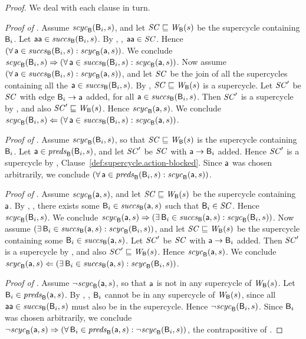 \begin{proof}
We deal with each clause in turn.


\textit{Proof of }.
%
Assume $\scyc{\B}{s}{\B_i}$, and let $\SC \subg \wfg{\B}{s}$ be the supercycle containing $\B_i$.  Let
$\actp \in \succs{\B}{s}{\B_i}$.  By , ,
$\actp \in \SC$.  Hence $(\fa \act \in \succs{\B}{s}{\B_i} : \scyc{\B}{s}{\act})$.
We conclude
$\scyc{\B}{s}{\B_i} \imp (\fa \act \in \succs{\B}{s}{\B_i} : \scyc{\B}{s}{\act})$.
%
Now assume $(\fa \act \in \succs{\B}{s}{\B_i} : \scyc{\B}{s}{\act})$, and let 
$\SC$ be the join of all the supercycles containing all the $\act \in \succs{\B}{s}{\B_i}$. 
By , $\SC \subg \wfg{\B}{s}$ is a supercycle.
Let $\SC'$ be $\SC$ with edge $\B_i \ar \act$ added, for all 
$\act \in \succs{\B}{s}{\B_i}$.
Then $\SC'$ is a supercycle by 
, and also $\SC' \subg \wfg{\B}{s}$. Hence $\scyc{\B}{s}{\act}$.
We conclude 
$\scyc{\B}{s}{\B_i} \folf (\fa \act \in \succs{\B}{s}{\B_i} : \scyc{\B}{s}{\act})$.




\textit{Proof of }.
%
Assume $\scyc{\B}{s}{\B_i}$, so that $\SC \subg \wfg{\B}{s}$ is the supercycle containing $\B_i$.
Let  $\act \in \preds{\B}{s}{\B_i}$, and let $\SC'$ be $\SC$ with 
$\act \ar \B_i$ added. Hence $\SC'$ is a supercycle by ,
  Clause~\ref{def:supercycle.action-blocked}.
Since $\act$ was chosen arbitrarily, we conclude 
$(\fa \act \in \preds{\B}{s}{\B_i} : \scyc{\B}{s}{\act})$.



\textit{Proof of }.
%
Assume $\scyc{\B}{s}{\act}$, and let $\SC \subg \wfg{\B}{s}$ be the supercycle containing $\act$.  By
, , there exists some
$\B_i \in \succs{\B}{s}{\act}$ such that $\B_i \in \SC$.  Hence $\scyc{\B}{s}{\B_i}$.
We conclude
$\scyc{\B}{s}{\act} \imp (\ex \B_i \in \succs{\B}{s}{\act} : \scyc{\B}{s}{\B_i})$.
%
Now assume $(\ex \B_i \in \succs{\B}{s}{\act} : \scyc{\B}{s}{\B_i})$, and let 
$\SC \subg \wfg{\B}{s}$ be the supercycle containing some $\B_i \in \succs{\B}{s}{\act}$. 
Let $\SC'$ be $\SC$ with $\act \ar \B_i$ added. Then $\SC'$ is a supercycle by 
, and also $\SC' \subg \wfg{\B}{s}$. Hence $\scyc{\B}{s}{\act}$.
We conclude 
$\scyc{\B}{s}{\act} \folf (\ex \B_i \in \succs{\B}{s}{\act} : \scyc{\B}{s}{\B_i})$.


\textit{Proof of }.  
%
Assume $\neg \scyc{\B}{s}{\act}$, so that $\act$ is not in any supercycle of $\wfg{\B}{s}$.
Let $\B_i \in \preds{\B}{s}{\act}$. 
By , , 
$\B_i$ cannot be in any supercycle of $\wfg{\B}{s}$, since all $\actp \in \succs{\B}{s}{\B_i}$ must
also be in the supercycle. Hence $\neg \scyc{\B}{s}{\B_i}$.
Since $\B_i$ was chosen arbitrarily, we conclude
$\neg \scyc{\B}{s}{\act} \imp  (\fa \B_i \in \preds{\B}{s}{\act} : \neg \scyc{\B}{s}{\B_i})$, the
contrapositive of .  
\end{proof}



